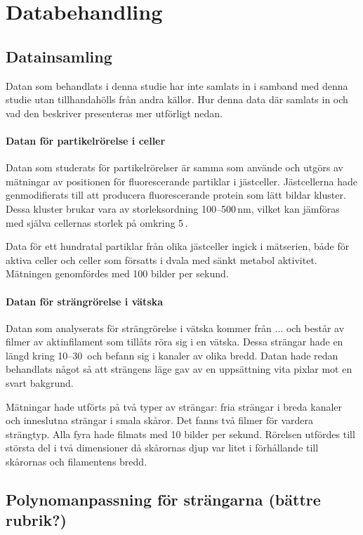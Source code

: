\chapter{Databehandling}


\section{Datainsamling}
Datan som behandlats i denna studie har inte samlats in i samband med denna studie utan tillhandahölls från andra källor. Hur denna data där samlats in och vad den beskriver presenteras mer utförligt nedan.

\subsubsection{Datan för partikelrörelse i celler}
Datan som studerats för partikelrörelser är samma som \cite{Midtveldt_etal2016} använde och utgörs av mätningar av positionen för fluorescerande partiklar i jästceller. Jästcellerna hade genmodifierats till att producera fluorescerande protein som lätt bildar kluster. 
Dessa kluster brukar vara av storleksordning 100--500\,nm, vilket kan jämföras med själva cellernas storlek på omkring 5\,.

Data för ett hundratal partiklar från olika jästceller ingick i mätserien, både för aktiva celler och celler som försatts i dvala med sänkt metabol aktivitet. Mätningen genomfördes med 100 bilder per sekund.


\subsubsection{Datan för strängrörelse i vätska}

Datan som analyserats för strängrörelse i vätska kommer från ... och består av filmer av aktinfilament som tillåts röra sig i en vätska. Dessa strängar hade en längd kring 10--30\, och befann sig i kanaler av olika bredd. Datan hade redan behandlats något så att strängens läge gav av en uppsättning vita pixlar mot en svart bakgrund.

Mätningar hade utförts på två typer av strängar: fria strängar i breda kanaler och inneslutna strängar i smala skåror. Det fanns två filmer för vardera strängtyp. Alla fyra hade filmats med 10 bilder per sekund. Rörelsen utfördes till största del i två dimensioner då skårornas djup var litet i förhållande till skårornas och filamentens bredd.


\section{Polynomanpassning för strängarna (bättre rubrik?)}







